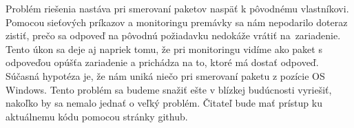 Problém riešenia nastáva pri smerovaní paketov naspäť k pôvodnému vlastníkovi. Pomocou sieťových príkazov a monitoringu premávky sa nám nepodarilo doteraz zistiť, prečo sa odpoveď na pôvodnú požiadavku nedokáže vrátiť na~zariadenie. Tento úkon sa deje aj napriek tomu, že pri monitoringu vidíme ako paket s odpoveďou opúšťa zariadenie a prichádza na to, ktoré má dostať odpoveď. Súčasná hypotéza je, že nám uniká niečo pri smerovaní paketu z pozície OS Windows. Tento problém sa budeme snažiť ešte v blízkej budúcnosti vyriešiť, nakoľko by sa nemalo jednať o veľký problém. Čitateľ bude mať prístup ku aktuálnemu kódu pomocou stránky github.   